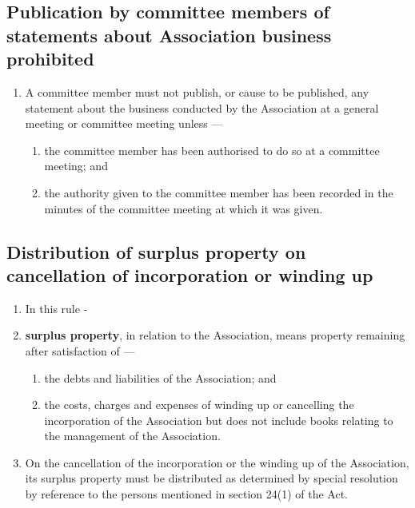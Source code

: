 \documentclass[../constitution.tex]{subfiles}
\begin{document}
\hypertarget{publication-by-committee-members-of-statements-about-association-business-prohibited}{%
\subsection{Publication by committee members of statements about Association business prohibited}\label{publication-by-committee-members-of-statements-about-association-business-prohibited}}

\begin{enumerate}

\item A committee member must not publish, or cause to be published, any statement about the business conducted by the Association at a general meeting or committee meeting unless ---

  \begin{enumerate}
  
  \item the committee member has been authorised to do so at a committee meeting; and
  \item the authority given to the committee member has been recorded in the minutes of the committee meeting at which it was given.
  \end{enumerate}
\end{enumerate}

\hypertarget{distribution-of-surplus-property-on-cancellation-of-incorporation-or-winding-up}{%
\subsection{Distribution of surplus property on cancellation of incorporation or winding up}\label{distribution-of-surplus-property-on-cancellation-of-incorporation-or-winding-up}}

\begin{enumerate}

\item In this rule -
\item \textbf{surplus property}, in relation to the Association, means property remaining after satisfaction of ---

  \begin{enumerate}
  
  \item the debts and liabilities of the Association; and
  \item the costs, charges and expenses of winding up or cancelling the incorporation of the Association but does not include books relating to the management of the Association.
  \end{enumerate}
\item On the cancellation of the incorporation or the winding up of the Association, its surplus property must be distributed as determined by special resolution by reference to the persons mentioned in section 24(1) of the Act.
\end{enumerate}
\end{document}
